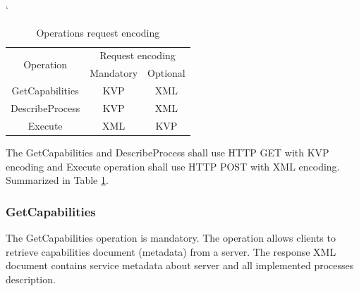 \documentclass[12pt,a4paper]{article}
\begin{document}
\bigskip
\begin{table}[h!]
\catcode`
\centering
\begin{tabular}{|c|c|c|}
\hline
\multirow{2}{*}{Operation} & \multicolumn{2}{c|}{Request encoding} \\ \cline{2-3} 
                           & Mandatory          & Optional         \\ \hhline{|=|=|=|}
GetCapabilities            & KVP                & XML              \\ \hline
DescribeProcess            & KVP                & XML              \\ \hline
Execute                    & XML                & KVP              \\ \hline
\end{tabular}
\caption{Operations request encoding}
\label{tab:WPS_encoding}
\end{table}

The GetCapabilities and DescribeProcess shall use HTTP GET with KVP encoding and Execute operation shall use HTTP
POST with XML encoding. Summarized in Table \ref{tab:WPS_encoding}.

\bigskip
\subsubsection{GetCapabilities}
The GetCapabilities operation is mandatory. The operation allows clients to retrieve capabilities document (metadata)
from a server. The response XML document contains service metadata about server and all implemented processes description.

\end{document}
